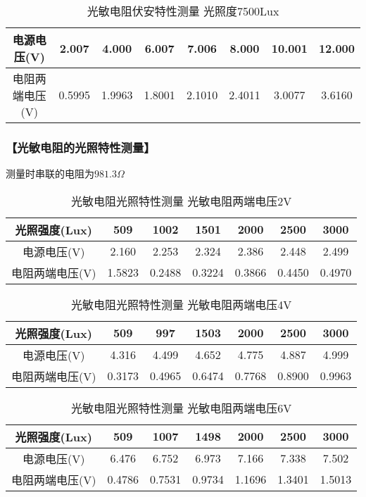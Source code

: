 \documentclass{ctexart}
\let\oldsubsubsection\subsubsection
\renewcommand{\subsubsection}[1]{\oldsubsubsection{\!\!\!\!\!\!【#1】}}
\begin{document}
\begin{table*}[!htbp]
  \centering
  \begin{tabular}{|c|c|c|c|c|c|c|c|}
    \hline
    电源电压(V) &2.007&4.000&6.007&7.006&8.000&10.001&12.000\\\hline
    电阻两端电压(V) &0.5995&1.9963&1.8001&2.1010&2.4011&3.0077&3.6160\\\hline
  \end{tabular}
  \caption{光敏电阻伏安特性测量 光照度7500Lux}
\end{table*}

\subsubsection{光敏电阻的光照特性测量}

测量时串联的电阻为$981.3\Omega$

\begin{table*}[!htbp]
  \centering
  \begin{tabular}{|c|c|c|c|c|c|c|}
    \hline
    光照强度(Lux) &509&1002&1501&2000&2500&3000\\\hline
    电源电压(V) &2.160&2.253&2.324&2.386&2.448&2.499\\\hline
    电阻两端电压(V) &1.5823&0.2488&0.3224&0.3866&0.4450&0.4970\\\hline
  \end{tabular}
  \caption{光敏电阻光照特性测量 光敏电阻两端电压2V}
\end{table*}

\begin{table*}[!htbp]
  \centering
  \begin{tabular}{|c|c|c|c|c|c|c|}
    \hline
    光照强度(Lux) &509&997&1503&2000&2500&3000\\\hline
    电源电压(V) &4.316&4.499&4.652&4.775&4.887&4.999\\\hline
    电阻两端电压(V) &0.3173&0.4965&0.6474&0.7768&0.8900&0.9963\\\hline
  \end{tabular}
  \caption{光敏电阻光照特性测量 光敏电阻两端电压4V}
\end{table*}

\begin{table*}[!htbp]
  \centering
  \begin{tabular}{|c|c|c|c|c|c|c|}
    \hline
    光照强度(Lux) &509&1007&1498&2000&2500&3000\\\hline
    电源电压(V) &6.476&6.752&6.973&7.166&7.338&7.502\\\hline
    电阻两端电压(V) &0.4786&0.7531&0.9734&1.1696&1.3401&1.5013\\\hline
  \end{tabular}
  \caption{光敏电阻光照特性测量 光敏电阻两端电压6V}
\end{table*}
\end{document}
